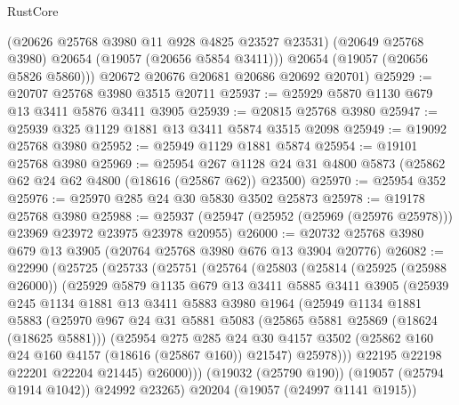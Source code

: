 \begin{lexlean}{RustCore}
\begin{coremodule}
          (@20626 @25768 @3980 @11 @928 @4825 @23527 @23531)
          (@20649 @25768 @3980)
          @20654
          (@19057 (@20656 @5854 @3411)))
        @20654
        (@19057 (@20656 @5826 @5860)))
      @20672
      @20676
      @20681
      @20686
      @20692
      @20701)
@25929 := @20707 @25768 @3980 @3515 @20711
@25937 := @25929 @5870 @1130 @679 @13 @3411 @5876 @3411 @3905
@25939 := @20815 @25768 @3980
@25947 := @25939 @325 @1129 @1881 @13 @3411 @5874 @3515 @2098
@25949 := @19092 @25768 @3980
@25952 := @25949 @1129 @1881 @5874
@25954 := @19101 @25768 @3980
@25969 := @25954
    @267
    @1128
    @24
    @31
    @4800
    @5873
    (@25862 @62 @24 @62 @4800 (@18616 (@25867 @62)) @23500)
@25970 := @25954 @352
@25976 := @25970 @285 @24 @30 @5830 @3502 @25873
@25978 := @19178 @25768 @3980
@25988 := @25937 (@25947 (@25952 (@25969 (@25976 @25978))) @23969 @23972 @23975 @23978 @20955)
@26000 := @20732 @25768 @3980 @679 @13 @3905 (@20764 @25768 @3980 @676 @13 @3904 @20776)
@26082 := @22990
    (@25725
      (@25733
        (@25751
          (@25764
            (@25803
              (@25814
                (@25925 (@25988 @26000))
                (@25929
                  @5879
                  @1135
                  @679
                  @13
                  @3411
                  @5885
                  @3411
                  @3905
                  (@25939
                    @245
                    @1134
                    @1881
                    @13
                    @3411
                    @5883
                    @3980
                    @1964
                    (@25949
                      @1134
                      @1881
                      @5883
                      (@25970
                        @967
                        @24
                        @31
                        @5881
                        @5083
                        (@25865 @5881 @25869 (@18624 (@18625 @5881)))
                        (@25954
                          @275
                          @285
                          @24
                          @30
                          @4157
                          @3502
                          (@25862 @160 @24 @160 @4157 (@18616 (@25867 @160)) @21547)
                          @25978)))
                    @22195
                    @22198
                    @22201
                    @22204
                    @21445)
                  @26000)))
            (@19032 (@25790 @190))
            (@19057 (@25794 @1914 @1042))
            @24992
            @23265)
          @20204
          (@19057 (@24997 @1141 @1915))

\end{coremodule}
\end{lexlean}
